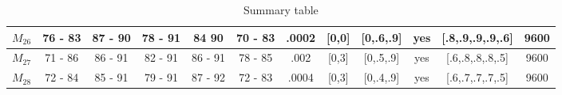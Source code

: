 \begin{table}[H]
{\begin{tabular}{|c|c|c|c|c|c|c|c|c|c|c|c|}
\rowcolor[HTML]{FFFFFF} 
$M_{26}$                                                                             & 76 - 83                                 & 87 - 90                                 & 78 - 91                                 & 84 90                                   & 70 - 83                                 & .0002                                                                                   & {[}0,0{]}                                                                                   & {[}0,.6,.9{]}                                                                               & yes                                                                                       & {[}.8,.9,.9,.9,.6{]}                                                                    & 9600                                                                                      \\ \hline
\rowcolor[HTML]{FFFFFF} 
$M_{27}$                                                                             & 71 - 86                                 & 86 - 91                                 & 82 - 91                                 & 86 - 91                                 & 78 - 85                                 & .002                                                                                    & {[}0,3{]}                                                                                   & {[}0,.5,.9{]}                                                                               & yes                                                                                       & {[}.6,.8,.8,.8,.5{]}                                                                    & 9600                                                                                      \\ \hline
\rowcolor[HTML]{FFFFFF} 
$M_{28}$                                                                             & 72 - 84                                 & 85 - 91                                 & 79 - 91                                 & 87 - 92                                 & 72 - 83                                 & .0004                                                                                   & {[}0,3{]}                                                                                   & {[}0,.4,.9{]}                                                                               & yes                                                                                       & {[}.6,.7,.7,.7,.5{]}                                                                    & 9600                                                                                      \\ \hline
\end{tabular}
}
\caption{Summary table}
\label{tab:summary_table_3}
\end{table}


